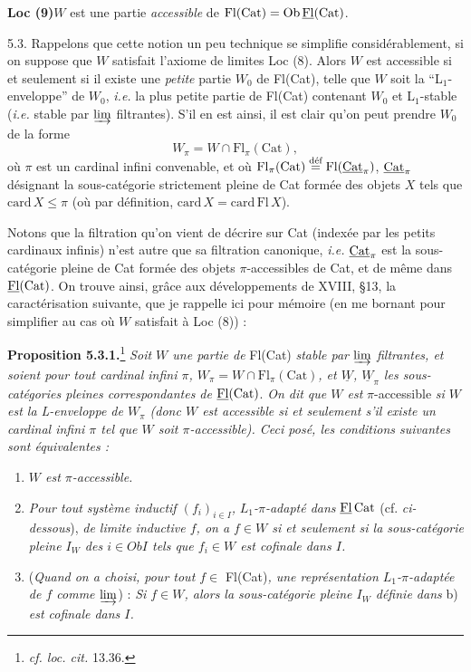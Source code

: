 \textbf{Loc (9)}\quad $W$ est une partie \textit{accessible} de $\mathrm{Fl}(\mathrm{Cat}) = \mathrm{Ob}\,\underline{\mathrm{Fl}}(\mathrm{Cat})$.

5.3. Rappelons que cette notion un peu technique se simplifie considérablement, si on suppose que $W$ satisfait l'axiome de limites Loc (8). Alors $W$ est accessible si et seulement si il existe une \textit{petite} partie $W_0$ de Fl(Cat), telle que $W$ soit la ``L$_1$-enveloppe'' de $W_0$, \textit{i.e.} la plus petite partie de Fl(Cat) contenant $W_0$ et L$_1$-stable (\textit{i.e.} stable par $\varinjlim$ filtrantes). S'il en est ainsi, il est clair qu'on peut prendre $W_0$ de la forme
\[
W_\pi = W \cap \mathrm{Fl}_\pi(\mathrm{Cat}),
\]
où $\pi$ est un cardinal infini convenable, et où $\mathrm{Fl}_\pi(\mathrm{Cat}) \overset{\text{déf}}{=} \mathrm{Fl}(\underline{\mathrm{Cat}}_\pi)$, $\underline{\mathrm{Cat}}_\pi$ désignant la sous-catégorie strictement pleine de Cat formée des objets $X$ tels que $\mathrm{card}\,X \leq \pi$ (où par définition, $\mathrm{card}\,X = \mathrm{card}\,\mathrm{Fl}\,X$).

Notons que la filtration qu'on vient de décrire sur Cat (indexée par les petits cardinaux infinis) n'est autre que sa filtration canonique, \textit{i.e.} $\underline{\mathrm{Cat}}_\pi$ est la sous-catégorie pleine de Cat formée des objets $\pi$-accessibles de Cat, et de même dans $\underline{\mathrm{Fl}}(\mathrm{Cat})$. On trouve ainsi, grâce aux développements de XVIII, §13, la caractérisation suivante, que je rappelle ici pour mémoire (en me bornant pour simplifier au cas où $W$ satisfait à Loc (8)) :

\textbf{Proposition 5.3.1.}\footnote[38]{\textit{cf. loc. cit.} 13.36.} \textit{Soit $W$ une partie de} Fl(Cat) \textit{stable par $\varinjlim$ filtrantes, et soient pour tout cardinal infini $\pi$, $W_\pi = W \cap \mathrm{Fl}_\pi(\mathrm{Cat})$, et $\underline{W}$, $\underline{W}_\pi$ les sous-catégories pleines correspondantes de} $\underline{\mathrm{Fl}}(\mathrm{Cat})$. \textit{On dit que $W$ est} $\pi$-accessible \textit{si $W$ est la L-enveloppe de $W_\pi$ (donc $W$ est accessible si et seulement s'il existe un cardinal infini $\pi$ tel que $W$ soit $\pi$-accessible). Ceci posé, les conditions suivantes sont équivalentes :}


\begin{enumerate}[label={}]
\item[a)] \textit{$W$ est $\pi$-accessible.}
\item[b)] \textit{Pour tout système inductif $(f_i)_{i\in I}$,}
\textit{$L_1$-$\pi$-adapté dans} $\underline{\mathrm{Fl}}\,\mathrm{Cat}$ (cf. \textit{ci-dessous}), \textit{de limite inductive $f$, on a $f \in W$ si et seulement si la sous-catégorie pleine $I_W$ des $i \in \mathit{Ob}I$ tels que $f_i \in W$ est cofinale dans $I$.}
\item[b$'$)] (\textit{Quand on a choisi, pour tout $f \in$} Fl(Cat)\textit{, une représentation $L_1$-$\pi$-adaptée de $f$ comme $\varinjlim$}) : \textit{Si $f \in W$, alors la sous-catégorie pleine $I_W$ définie dans} b) \textit{est cofinale dans $I$.}
\end{enumerate}

